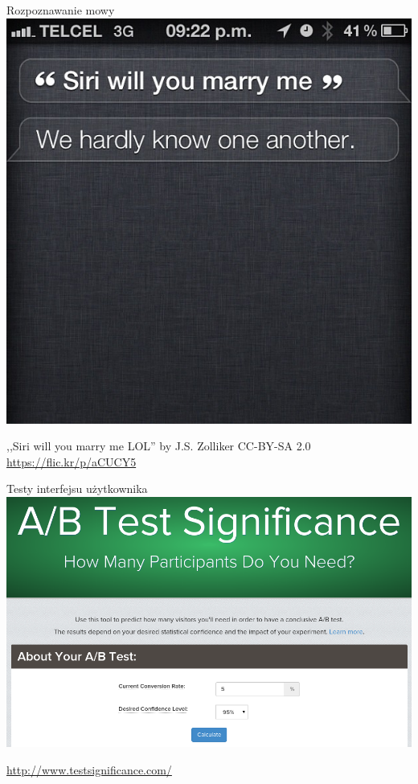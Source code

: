 \documentclass{beamer}
\begin{document}
\begin{frame}{Rozpoznawanie mowy}
\centering\includegraphics[width=.8\textwidth,viewport=0 50mm 220mm 220mm,clip]{siri.jpg}

{\tiny ,,Siri will you marry me LOL'' by J.S. Zolliker CC-BY-SA 2.0 \url{https://flic.kr/p/aCUCY5}}
\end{frame}
\begin{frame}{Testy interfejsu użytkownika}
\centering\includegraphics[width=.9\textwidth]{ab.png}

{\tiny \url{http://www.testsignificance.com/}}
\end{frame}
\end{document}
